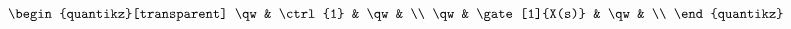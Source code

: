 \documentclass[10pt]{article}
\begin{document}
\[\begin{quantikz}[transparent]
    \qw &     \ctrl{1}   & \qw & \\
    \qw &     \gate[1]{X(s)}                            & \qw & \\
\end{quantikz}
\]
\end{document}
